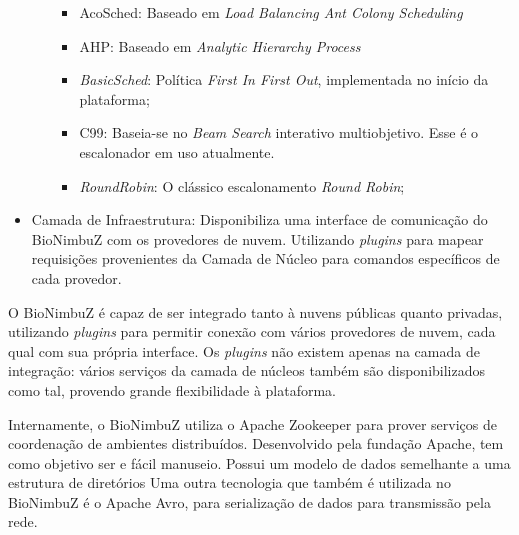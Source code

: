\begin{itemize}
\begin{itemize}
\begin{itemize}
			\item AcoSched: Baseado em \textit{Load Balancing Ant Colony Scheduling}\cite{6732620_BioNimbuZ_ACOsched}
			\item AHP: Baseado em \textit{Analytic Hierarchy Process}\cite{6732620_BioNimbuZ_ACOsched}
			\item \textit{BasicSched}: Política \textit{First In First Out}, implementada no início da plataforma;
			\item C99: Baseia-se no \textit{Beam Search} interativo multiobjetivo. \cite{BioNimbuZ_Willian_C99} Esse é o escalonador em uso atualmente.
			\item \textit{RoundRobin}: O clássico escalonamento \textit{Round Robin};
		\end{itemize}
	
	\end{itemize}
	
	\item Camada de Infraestrutura: Disponibiliza uma interface de comunicação do BioNimbuZ com os provedores de nuvem. Utilizando \textit{plugins} para mapear requisições provenientes da Camada de Núcleo para comandos específicos de cada provedor.
\end{itemize}

O BioNimbuZ é capaz de ser integrado tanto à nuvens públicas quanto privadas, utilizando \textit{plugins} para permitir conexão com vários provedores de nuvem, cada qual com sua própria interface. Os \textit{plugins} não existem apenas na camada de integração: vários serviços da camada de núcleos também são disponibilizados como tal, provendo grande flexibilidade à plataforma.

Internamente, o BioNimbuZ utiliza o Apache Zookeeper\cite{Zookeeper} para prover serviços de coordenação de ambientes distribuídos. Desenvolvido pela fundação Apache\cite{Apache}, tem como objetivo ser e fácil manuseio. Possui um modelo de dados semelhante a uma estrutura de diretórios
Uma outra tecnologia que também é utilizada no BioNimbuZ é o Apache Avro\cite{Avro}, para serialização de dados para transmissão pela rede.
